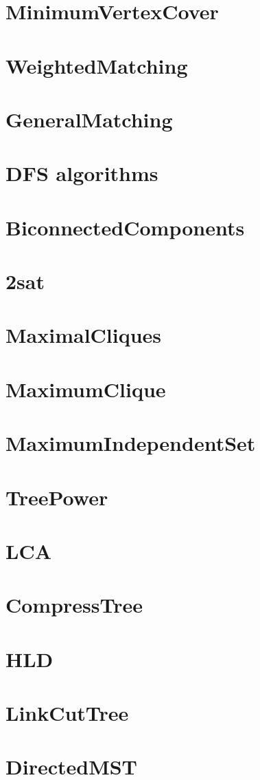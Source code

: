 \section{MinimumVertexCover}
\section{WeightedMatching}
\section{GeneralMatching}

\section{DFS algorithms}
\section{BiconnectedComponents}
\section{2sat}

\section{MaximalCliques}
\section{MaximumClique}
\section{MaximumIndependentSet}

\section{TreePower}
\section{LCA}
\section{CompressTree}
\section{HLD}
\section{LinkCutTree}
\section{DirectedMST}
